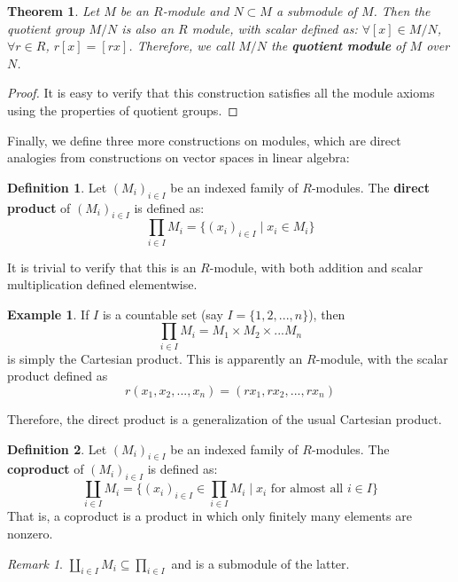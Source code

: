 \documentclass[12pt, a4paper, titlepage]{report}
\theoremstyle{plain} %
\newtheorem{thm}{Theorem}[section]
\theoremstyle{definition}
\newtheorem{defn}{Definition}[section]
\newtheorem{exmp}{Example}[section]
\theoremstyle{remark}
\newtheorem*{rem}{Remark}
\begin{document}
\begin{thm}
  Let $M$ be an $R$-module and $N \subset M$ a submodule of $M$. Then the quotient group $M/N$ is also an $R$ module, with
  scalar defined as: $\forall [x] \in M/N$, $\forall r \in R$, $r[x] = [rx]$. Therefore, we call $M/N$ the \textbf{quotient module}
  of $M$ over $N$.
\end{thm}

\begin{proof}
  It is easy to verify that this construction satisfies all the module axioms using the properties of quotient groups.
\end{proof}

Finally, we define three more constructions on modules, which are direct analogies from constructions on vector spaces in linear algebra:

\begin{defn}
  Let $(M_i)_{i \in I}$ be an indexed family of $R$-modules. The \textbf{direct product} of $(M_i)_{i \in I}$ is defined as:
  \[
    \prod_{i \in I} M_i = \{ (x_i)_{i \in I} \mid x_i \in M_i \}
  \]
\end{defn}

It is trivial to verify that this is an $R$-module, with both addition and scalar multiplication defined elementwise.

\begin{exmp}
  If $I$ is a countable set (say $I = \{ 1, 2, ..., n \}$), then
  \[
    \prod_{i \in I} M_i = M_1 \times M_2 \times ... M_n
  \]
  is simply the Cartesian product. This is apparently an $R$-module, with the scalar product defined as
  \[
    r(x_1, x_2, ..., x_n) = (rx_1, rx_2, ..., rx_n)
  \]

  Therefore, the direct product is a generalization of the usual Cartesian product.
\end{exmp}

\begin{defn}
  Let $(M_i)_{i \in I}$ be an indexed family of $R$-modules. The \textbf{coproduct} of $(M_i)_{i \in I}$ is defined as:
  \[
    \coprod_{i \in I} M_i = \{ (x_i)_{i \in I} \in \prod_{i \in I} M_i \mid x_i \text{ for almost all } i \in I \}
  \]
  That is, a coproduct is a product in which only finitely many elements are nonzero.
\end{defn}

\begin{rem}
  $\coprod_{i \in I} M_i \subseteq \prod_{i \in I}$ and is a submodule of the latter.
\end{rem}
\end{document}
